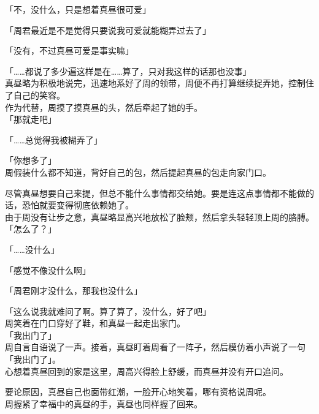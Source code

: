 「不，没什么，只是想着真昼很可爱」

「周君最近是不是觉得只要说我可爱就能糊弄过去了」

「没有，不过真昼可爱是事实嘛」

「……都说了多少遍这样是在……算了，只对我这样的话那也没事」\\

真昼略为积极地说完，迅速地系好了周的领带，周便不再打算继续捉弄她，控制住了自己的笑容。\\

作为代替，周摸了摸真昼的头，然后牵起了她的手。\\

「那就走吧」

「……总觉得我被糊弄了」

「你想多了」\\

周假装什么都不知道，背好自己的包，然后提起真昼的包走向家门口。

尽管真昼想要自己来提，但总不能什么事情都交给她。要是连这点事情都不能做的话，恐怕就要变得彻底依赖她了。\\

由于周没有让步之意，真昼略显高兴地放松了脸颊，然后拿头轻轻顶上周的胳膊。\\

「怎么了？」

「……没什么」

「感觉不像没什么啊」

「周君刚才没什么，那我也没什么」

「这么说我就难问了啊。算了算了，没什么，好了吧」\\

周笑着在门口穿好了鞋，和真昼一起走出家门。\\

「我出门了」\\

周自言自语说了一声。接着，真昼盯着周看了一阵子，然后模仿着小声说了一句「我出门了」。\\

心想着真昼回到的家是这里，周高兴得脸上舒缓，而真昼并没有开口追问。

要论原因，真昼自己也面带红潮，一脸开心地笑着，哪有资格说周呢。\\

周握紧了幸福中的真昼的手，真昼也同样握了回来。

